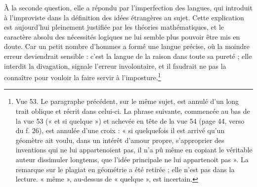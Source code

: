\documentclass[11pt,a4paper]{article}
\begin{document}
À la seconde question, elle a répondu par l'imperfection des langues, qui
introduit à l'improviste dans la définition des idées étrangères au sujet. Cette
explication est aujourd'hui pleinement justifiée par les théories
mathématiques, et le caractère absolu des nécessités logiques ne lui semble plus
pouvoir être mis en doute. Car un petit nombre d'hommes a formé une langue
précise, où la moindre erreur deviendrait sensible : c'est la langue de la
raison dans toute sa pureté ; elle interdit la divagation, signale l'erreur
involontaire, et il faudrait ne pas la connaître pour vouloir la faire servir à
l'imposture.\footnote{Vue 53. Le paragraphe précédent, sur le même sujet, est
annulé d'un long trait oblique et récrit dans celui-ci. La phrase suivante,
commencée au bas de la vue 53 (« et si quelque ») et achevée en tête de la vue
54 (page 44, verso du f. 26), est annulée d'une croix : « si quelquefois il est
arrivé qu'un géomètre ait voulu, dans un intérêt d'amour propre, s'approprier
des inventions qui ne lui appartenoient pas, il n'a pû même en copiant le
véritable auteur dissimuler longtems, que l'idée principale ne lui appartenoit
pas ». La remarque sur le plagiat en géométrie a été retirée ; elle n'est pas
dans la lecture. « même », au-dessus de « quelque », est incertain.}
\end{document}
